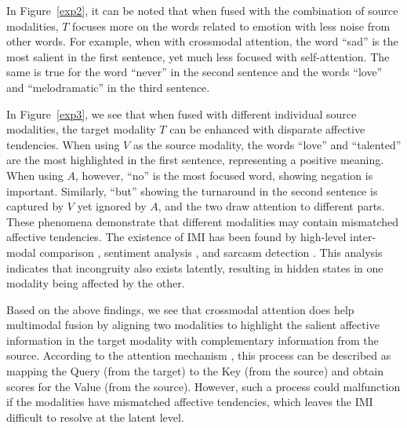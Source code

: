 \documentclass[11pt,a4paper]{article}
\begin{document}
In Figure~\ref{exp2}, it can be noted that when fused with the combination of source modalities, $T$ focuses more on the words related to emotion with less noise from other words. For example, when with crossmodal attention, the word ``sad'' is the most salient in the first sentence, yet much less focused with self-attention. The same is true for the word ``never'' in the second sentence and the words ``love'' and ``melodramatic'' in the third sentence.

In Figure~\ref{exp3}, we see that when fused with different individual source modalities, the target modality $T$ can be enhanced with disparate affective tendencies. When using $V$ as the source modality, the words ``love'' and ``talented'' are the most highlighted in the first sentence, representing a positive meaning. When using $A$, however, ``no'' is the most focused word, showing negation is important. Similarly, ``but'' showing the turnaround in the second sentence is captured by $V$ yet ignored by $A$, and the two draw attention to different parts. These phenomena demonstrate that different modalities may contain mismatched affective tendencies. The existence of IMI has been found by high-level inter-modal comparison \citep{Desai2022}, sentiment analysis \citep{li2019}, and sarcasm detection \citep{Wu2021}. This analysis indicates that incongruity also exists latently, resulting in hidden states in one modality being affected by the other.

Based on the above findings, we see that crossmodal attention does help multimodal fusion by aligning two modalities to highlight the salient affective information in the target modality with complementary information from the source. According to the attention mechanism \citep{Vaswani2017}, this process can be described as mapping the Query (from the target) to the Key (from the source) and obtain scores for the Value (from the source). However, such a process could malfunction if the modalities have mismatched affective tendencies, which leaves the IMI difficult to resolve at the latent level.
\end{document}
